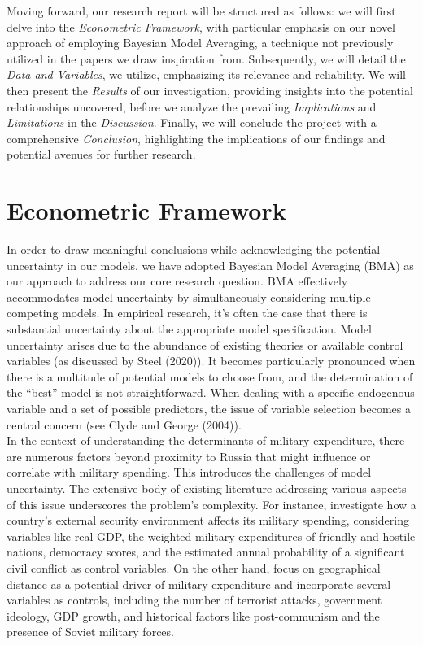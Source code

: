 \documentclass[12pt,a4paper]{article}
\begin{document}
Moving forward, our research report will be structured as follows: we will first delve into the \textit{Econometric Framework}, with particular emphasis on our novel approach of employing Bayesian Model Averaging, a technique not previously utilized in the papers we draw inspiration from. Subsequently, we will detail the \textit{Data and Variables}, we utilize, emphasizing its relevance and reliability. We will then present the \textit{Results} of our investigation, providing insights into the potential relationships uncovered, before we analyze the prevailing \textit{Implications} and \textit{Limitations}   in the \textit{Discussion}. Finally, we will conclude the project with a comprehensive \emph{Conclusion}, highlighting the implications of our findings and potential avenues for further research.

\section{Econometric Framework}
In order to draw meaningful conclusions while acknowledging the potential uncertainty in our models, we have adopted Bayesian Model Averaging (BMA) as our approach to address our core research question. BMA effectively accommodates model uncertainty by simultaneously considering multiple competing models. In empirical research, it’s often the case that there is substantial uncertainty about the appropriate model specification. Model uncertainty arises due to the abundance of existing theories or available control variables (as discussed by Steel (2020)). It becomes particularly pronounced when there is a multitude of potential models to choose from, and the determination of the “best” model is not straightforward. When dealing with a specific endogenous variable and a set of possible predictors, the issue of variable selection becomes a central concern (see Clyde and George (2004)). \\

In the context of understanding the determinants of military expenditure, there are numerous factors beyond proximity to Russia that might influence or correlate with military spending. This introduces the challenges of model uncertainty. The extensive body of existing literature addressing various aspects of this issue underscores the problem’s complexity. For instance, \citet{nordhaus2012} investigate how a country’s external security environment affects its military spending, considering variables like real GDP, the weighted military expenditures of friendly and hostile nations, democracy scores, and the estimated annual probability of a significant civil conflict as control variables. On the other hand, \citet{kofrovn2023} focus on geographical distance as a potential driver of military expenditure and incorporate several variables as controls, including the number of terrorist attacks, government ideology, GDP growth, and historical factors like post-communism and the presence of Soviet military forces. \\
\end{document}
